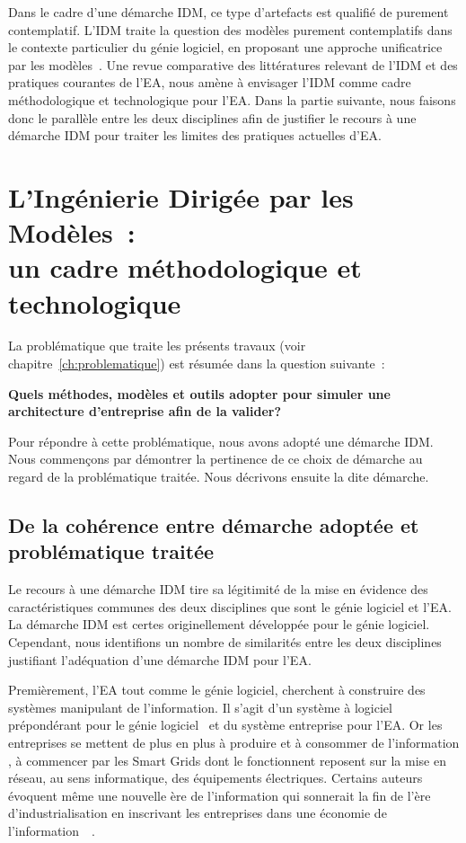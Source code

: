 Dans le cadre d'une démarche IDM, ce type d'artefacts est qualifié
de purement contemplatif. L'IDM traite la question des modèles purement
contemplatifs dans le contexte particulier du génie logiciel, en proposant
une approche unificatrice par les modèles~\cite{jezequel2006genie}.
Une revue comparative des littératures relevant de l'IDM et des pratiques courantes
de l'EA, nous amène à envisager l'IDM comme cadre méthodologique
et technologique pour l'EA. Dans la partie suivante,
nous faisons donc le parallèle entre les deux disciplines afin de
justifier le recours à une démarche IDM  pour traiter les limites  des
pratiques actuelles d'EA.

\section{L'Ingénierie Dirigée par les Modèles~:\\ un cadre méthodologique et technologique}

    La problématique que traite les présents travaux (voir chapitre~\ref{ch:problematique})
    est résumée dans la question suivante~:

    {\bfseries Quels méthodes, modèles et outils adopter pour simuler une architecture d'entreprise afin de la valider?}

    Pour répondre à cette problématique, nous avons adopté une démarche IDM.
    Nous commençons par démontrer la pertinence de ce choix de démarche
    au regard de la problématique traitée.  Nous décrivons ensuite la dite démarche.

    \subsection{De la cohérence entre démarche adoptée et
    problématique traitée}

    Le recours à une démarche IDM tire sa légitimité de la mise en
    évidence des caractéristiques communes des deux disciplines que
    sont le génie logiciel et l'EA. La démarche IDM est certes originellement développée
    pour le génie logiciel. Cependant, nous identifions un nombre de similarités
    entre les deux disciplines justifiant l'adéquation d'une démarche IDM pour l'EA.

    Premièrement, l'EA tout comme le génie logiciel, cherchent à construire
    des systèmes manipulant de l'information. Il s'agit d'un système à
    logiciel prépondérant pour le génie
    logiciel~\cite{jezequel2012ingenierie} et du système entreprise pour l'EA.
    Or les entreprises se mettent de plus en plus à produire et à
    consommer de l'information \cite{zachman1997enterprise}, à
    commencer par les Smart Grids dont le fonctionnent reposent sur la
    mise en réseau, au sens informatique, des équipements électriques. Certains auteurs
    évoquent même une nouvelle ère de l'information qui sonnerait
    la fin de l'ère d'industrialisation en inscrivant les entreprises dans une économie
    de l'information~\cite{toffler1981third}~\cite{webster2014theories}.

